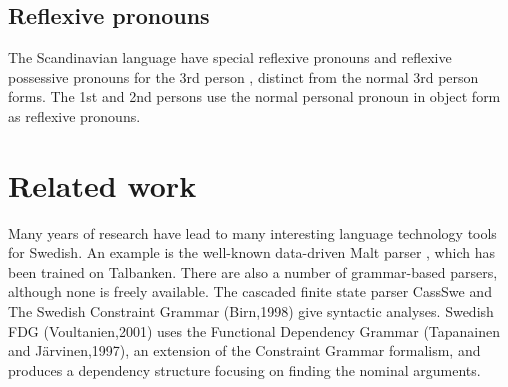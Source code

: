 \documentclass{report}
\begin{document}
\subsection*{Reflexive pronouns}
\label{swe:refl}
The Scandinavian language have special reflexive pronouns
and reflexive possessive pronouns for the 3rd
person \cite[ \& 319]{H&H}, distinct from the normal 3rd person forms.
The 1st and 2nd persons use the normal personal pronoun in object form as reflexive
pronouns.



\section{Related work}
\label{sec:related}
Many years of research have lead to many interesting language
technology tools for Swedish.
An example is the well-known data-driven Malt parser \cite{malt},
which has been trained on Talbanken. 
There are also a number of grammar-based parsers, although none is freely available.
The cascaded finite state parser CassSwe \cite{casswe} and
The Swedish Constraint Grammar (Birn,1998) 
give syntactic analyses. %
Swedish FDG (Voultanien,2001) uses the Functional Dependency Grammar
(Tapanainen and Järvinen,1997), an extension of the Constraint Grammar
formalism, and produces a dependency structure focusing on finding the nominal
arguments. \\
\end{document}
